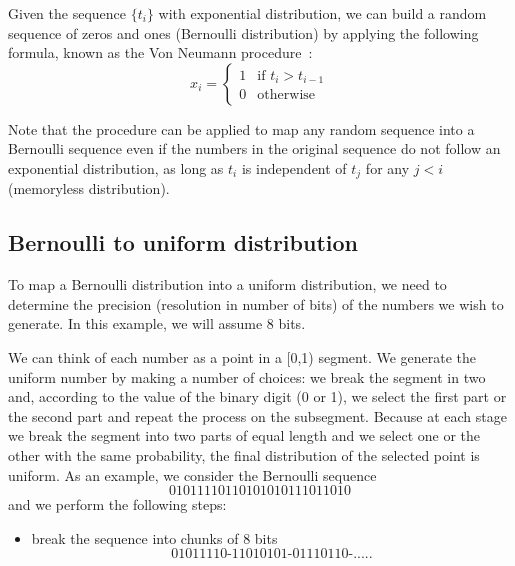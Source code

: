 \documentclass[justified,sixbynine]{tufte-book}
\theoremstyle{plain}%
\theoremstyle{definition}
\theoremstyle{remark}
\begin{document}
\begin{fullwidth}

Given the sequence $\{t_i\}$ with exponential distribution, we can build a
random sequence of zeros and ones (Bernoulli distribution) by applying the following formula, known as the Von Neumann procedure~\cite{bits}:
\begin{equation}
x_i=
\begin{cases}
1 & \text{if }t_{i}>t_{i-1} \\
0 & \text{otherwise}
\end{cases}
\end{equation}

Note that the procedure can be applied to map any random sequence into
a Bernoulli sequence even if the numbers in the original sequence do not
follow an exponential distribution, as long as $t_i$ is independent of $t_j$
for any $j<i$ (memoryless distribution).

\goodbreak\subsection{Bernoulli to uniform distribution}


To map a Bernoulli distribution into a uniform distribution, we need
to determine the precision (resolution in number of bits) of the numbers we wish
to generate. In this example, we will assume 8 bits.

We can think of each number as a point in a [0,1) segment. We generate the
uniform number by making a number of choices: we break the segment in two
and, according to the value of the binary digit (0 or 1), we select the first
part or the second part and repeat the process on the subsegment. Because
at each stage we break the segment into two parts of equal length and we
select one or the other with the same probability, the final distribution of
the selected point is uniform. As an example, we consider the Bernoulli
sequence
\begin{equation}
01011110110101010111011010
\end{equation}
and we perform the following steps:

\begin{itemize}
\item  break the sequence into chunks of 8 bits
\begin{equation}
\text{01011110-11010101-01110110-.....}
\end{equation}


\end{itemize}
\end{fullwidth}
\end{document}
